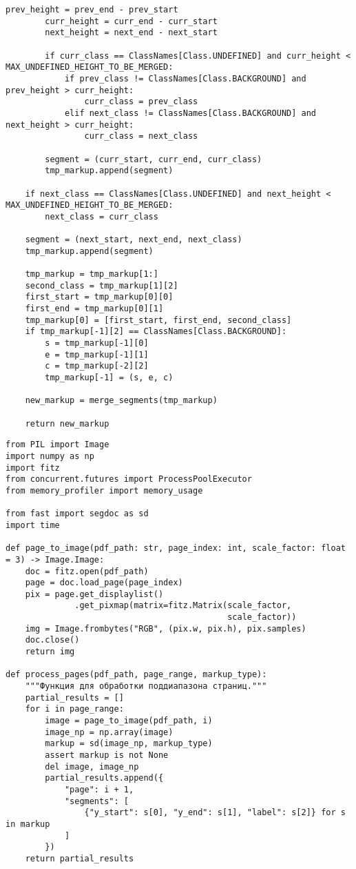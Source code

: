 \begin{lstlisting}[caption={Функция создания объединенной разметки (часть 3)}, label={lst:}]
        prev_height = prev_end - prev_start
        curr_height = curr_end - curr_start
        next_height = next_end - next_start

        if curr_class == ClassNames[Class.UNDEFINED] and curr_height < MAX_UNDEFINED_HEIGHT_TO_BE_MERGED:
            if prev_class != ClassNames[Class.BACKGROUND] and prev_height > curr_height:
                curr_class = prev_class
            elif next_class != ClassNames[Class.BACKGROUND] and next_height > curr_height:
                curr_class = next_class

        segment = (curr_start, curr_end, curr_class)
        tmp_markup.append(segment)

    if next_class == ClassNames[Class.UNDEFINED] and next_height < MAX_UNDEFINED_HEIGHT_TO_BE_MERGED:
        next_class = curr_class

    segment = (next_start, next_end, next_class)
    tmp_markup.append(segment)

    tmp_markup = tmp_markup[1:]
    second_class = tmp_markup[1][2]
    first_start = tmp_markup[0][0]
    first_end = tmp_markup[0][1]
    tmp_markup[0] = [first_start, first_end, second_class]
    if tmp_markup[-1][2] == ClassNames[Class.BACKGROUND]:
        s = tmp_markup[-1][0]
        e = tmp_markup[-1][1]
        c = tmp_markup[-2][2]
        tmp_markup[-1] = (s, e, c)

    new_markup = merge_segments(tmp_markup)

    return new_markup
\end{lstlisting}

\newpage

\begin{lstlisting}[caption={Скрипт, используемый в исследовании (часть 1)}, label={lst:mainbench}]
from PIL import Image
import numpy as np
import fitz
from concurrent.futures import ProcessPoolExecutor
from memory_profiler import memory_usage

from fast import segdoc as sd
import time

def page_to_image(pdf_path: str, page_index: int, scale_factor: float = 3) -> Image.Image:
    doc = fitz.open(pdf_path)
    page = doc.load_page(page_index)
    pix = page.get_displaylist()
              .get_pixmap(matrix=fitz.Matrix(scale_factor,
                                             scale_factor))
    img = Image.frombytes("RGB", (pix.w, pix.h), pix.samples)
    doc.close()
    return img

def process_pages(pdf_path, page_range, markup_type):
    """Функция для обработки поддиапазона страниц."""
    partial_results = []
    for i in page_range:
        image = page_to_image(pdf_path, i)
        image_np = np.array(image)
        markup = sd(image_np, markup_type)
        assert markup is not None
        del image, image_np
        partial_results.append({
            "page": i + 1,
            "segments": [
                {"y_start": s[0], "y_end": s[1], "label": s[2]} for s in markup
            ]
        })
    return partial_results
\end{lstlisting}

